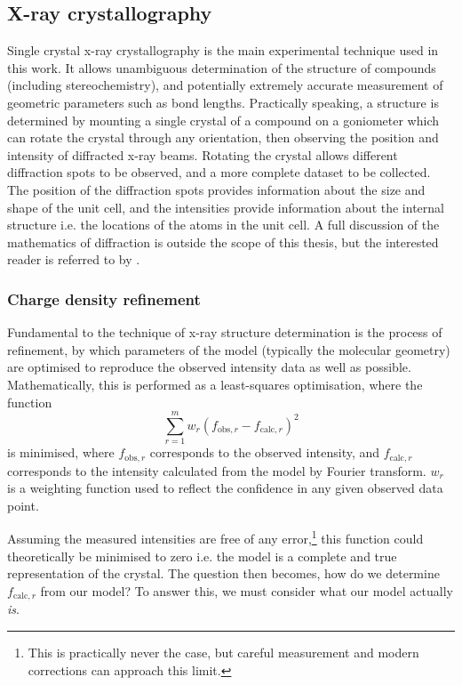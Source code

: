 \begin{refsection}
\subsection{X-ray crystallography}
Single crystal x-ray crystallography is the main experimental technique used in this work.
It allows unambiguous determination of the structure of compounds (including stereochemistry), and potentially extremely accurate measurement of geometric parameters such as bond lengths.
Practically speaking, a structure is determined by mounting a single crystal of a compound on a goniometer which can rotate the crystal through any orientation, then observing the position and intensity of diffracted x-ray beams.
Rotating the crystal allows different diffraction spots to be observed, and a more complete dataset to be collected.
The position of the diffraction spots provides information about the size and shape of the unit cell, and the intensities provide information about the internal structure i.e. the locations of the atoms in the unit cell.
A full discussion of the mathematics of diffraction is outside the scope of this thesis, but the interested reader is referred to  by \citeauthor{Stout1989}.\autocite{Stout1989}

\subsubsection{Charge density refinement}
Fundamental to the technique of x-ray structure determination is the process of refinement, by which parameters of the model (typically the molecular geometry) are optimised to reproduce the observed intensity data as well as possible.
Mathematically, this is performed as a least-squares optimisation, where the function
\begin{equation}
    \sum^{m}_{r=1} w_{r} \left(f_{\mathrm{obs}, r} - f_{\mathrm{calc}, r} \right) ^{2}
\end{equation}
is minimised, where $f_{\mathrm{obs}, r}$ corresponds to the observed intensity, and $f_{\mathrm{calc}, r}$ corresponds to the intensity calculated from the model by Fourier transform.
$w_{r}$ is a weighting function used to reflect the confidence in any given observed data point.

Assuming the measured intensities are free of any error,\footnote{This is practically never the case, but careful measurement and modern corrections can approach this limit.} this function could theoretically be minimised to zero i.e. the model is a complete and true representation of the crystal.
The question then becomes, how do we determine $f_{\mathrm{calc}, r}$ from our model?
To answer this, we must consider what our model actually \emph{is}.


\end{refsection}
